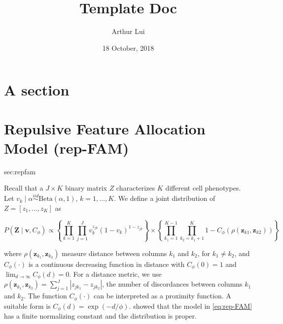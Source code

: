 \documentclass[12pt]{article} %
\title{Template Doc}
\author{Arthur Lui}
\date{18 October, 2018} %
\newcommand{\p}[1]{\left(#1\right)}
\newcommand{\bk}[1]{\left[#1\right]}
\newcommand{\bc}[1]{ \left\{#1\right\} }
\newcommand{\abs}[1]{ \left|#1\right| }
\newcommand{\Beta}{ \text{Beta} }
\newcommand{\iid}{\overset{iid}{\sim}}
\begin{document}
\maketitle

\tableofcontents \newpage %

\section{A section}\label{sec:a-section} %
\section{Repulsive Feature Allocation Model (rep-FAM)}{sec:repfam}


Recall that a $J \times K$ binary matrix $Z$ characterizes $K$ different cell phenotypes.
Let $v_k \mid \alpha \iid \Beta(\alpha, 1)$, $k = 1, \dots , K$.
We define a joint distribution of $Z = \bk{z_1, \dots, z_K}$ as

$$
P(\bm Z \mid \bm v , C_\phi) \propto \bc{\prod_{k=1}^K \prod_{j=1}^J v_k^{z_{jk}} (1 - v_k)^{1 - z_{jk}}}
\times
\bc{\prod_{k_1=1}^{K-1} \prod_{k_2=k_1+1}^K 1 - C_\phi(\rho(\bm z_{k1}, \bm z_{k2}))}
$$

where $\rho(\bm z_{k_1}, \bm z_{k_2})$ measure distance between columns $k_1$ and
$k_2$, for $k_1 \neq k_2$, and $C_\phi(\cdot)$ is a continuous decreasing
function in distance with $C_\phi(0)=1$ and
$\lim_{d\rightarrow\infty}C_\phi(d)= 0$. For a distance metric, we use
$\rho(\bm z_{k_1}, \bm z_{k_2})=\sum_{j=1}^J \abs{z_{jk_1} - z_{jk_2}}$, the number
of discordances between columns $k_1$ and $k_2$. The function $C_\phi(\cdot)$
can be interpreted as a proximity function. A suitable form is $C_\phi(d) =
\exp\p{-d/\phi}$. \cite{quinlan2017parsimonious} showed that the model in
\eqref{eq:rep-FAM} has a finite normalizing constant and the distribution is
proper.



\end{document}
